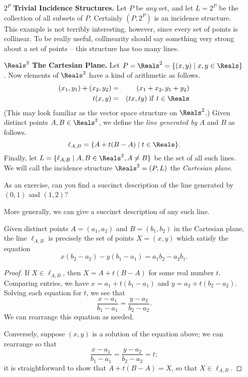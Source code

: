 \documentclass{article}
\begin{document}
\begin{itemize}
\item[$2^P$] \textbf{Trivial Incidence Structures.} Let $P$ be \emph{any} set, and let $L = 2^P$ be the collection of all subsets of $P$. Certainly $(P, 2^P)$ is an incidence structure. This example is not terribly interesting, however, since every set of points is collinear. To be really useful, collinearity should say something very strong about a set of points -- this structure has too many lines.


\item[$\Reals^2$] \textbf{The Cartesian Plane.} Let $P = \Reals^2 = \{ (x,y) \mid x,y \in \Reals \}$. Now elements of $\Reals^2$ have a kind of arithmetic as follows.
\begin{eqnarray*}
(x_1, y_1) + (x_2, y_2) & = & (x_1 + x_2, y_1 + y_2) \\
t(x,y) & = & (tx, ty)\ \mathrm{if}\ t \in \Reals
\end{eqnarray*}
(This may look familiar as the vector space structure on $\Reals^2$.) Given distinct points $A,B \in \Reals^2$, we define the \emph{line generated by} $A$ and $B$ as follows. \[ \ell_{A,B} = \{ A + t(B-A) \mid t \in \Reals \}. \] Finally, let $L = \{ \ell_{A,B} \mid A,B \in \Reals^2, A \neq B \}$ be the set of all such lines. We will call the incidence structure $\Reals^2 = (P,L)$ the \emph{Cartesian plane}.

As an exercise, can you find a succinct description of the line generated by $(0,1)$ and $(1,2)$?

More generally, we can give a succinct description of any such line.

\begin{prop}
Given distinct points $A = (a_1, a_2)$ and $B = (b_1, b_2)$ in the Cartesian plane, the line $\ell_{A,B}$ is precisely the set of points $X = (x, y)$ which satisfy the equation \[ x(b_2-a_2) - y(b_1-a_1) = a_1b_2 - a_2b_1. \]
\end{prop}

\begin{proof}
If $X \in \ell_{A,B}$, then $X = A + t(B-A)$ for some real number $t$. Comparing entries, we have $x = a_1 + t(b_1 - a_1)$ and $y = a_2 + t(b_2 - a_2)$. Solving each equation for $t$, we see that \[ \frac{x-a_1}{b_1-a_1} = \frac{y-a_2}{b_2-a_2}. \] We can rearrange this equation as needed.

Conversely, suppose $(x,y)$ is a solution of the equation above; we can rearrange so that \[ \frac{x-a_1}{b_1-a_1} = \frac{y-a_2}{b_2-a_2} = t; \] it is straightforward to show that $A + t(B-A) = X$, so that $X \in \ell_{A,B}$.
\end{proof}


\end{itemize}
\end{document}
